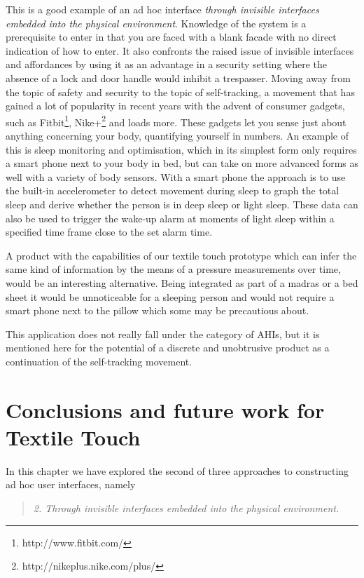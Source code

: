 This is a good example of an ad hoc interface \emph{through invisible interfaces embedded into the physical environment}.
Knowledge of the system is a prerequisite to enter in that you are faced with a blank facade with no direct indication of how to enter.
It also confronts the raised issue of invisible interfaces and affordances by using it as an advantage in a security setting where the absence of a lock and door handle would inhibit a trespasser.
\blank
Moving away from the topic of safety and security to the topic of self-tracking, a movement that has gained a lot of popularity in recent years with the advent of consumer gadgets, such as Fitbit\footnote{http://www.fitbit.com/}, Nike+\footnote{http://nikeplus.nike.com/plus/} and loads more. 
These gadgets let you sense just about anything concerning your body, quantifying yourself in numbers.
An example of this is sleep monitoring and optimisation, which in its simplest form only requires a smart phone next to your body in bed, but can take on more advanced forms as well with a variety of body sensors.
With a smart phone the approach is to use the built-in accelerometer to detect movement during sleep to graph the total sleep and derive whether the person is in deep sleep or light sleep.
These data can also be used to trigger the wake-up alarm at moments of light sleep within a specified time frame close to the set alarm time.

A product with the capabilities of our textile touch prototype which can infer the same kind of information by the means of a pressure measurements over time, would be an interesting alternative.
Being integrated as part of a madras or a bed sheet it would be unnoticeable for a sleeping person and would not require a smart phone next to the pillow which some may be precautious about.

This application does not really fall under the category of AHIs, but it is mentioned here for the potential of a discrete and unobtrusive product as a continuation of the self-tracking movement.

\section{Conclusions and future work for Textile Touch}
\label{ch:textiletouch:futurework}

In this chapter we have explored the second of three approaches to constructing ad hoc user interfaces, namely

\begin{quotation}
  \emph{2. Through invisible interfaces embedded into the physical environment.}
\end{quotation}

